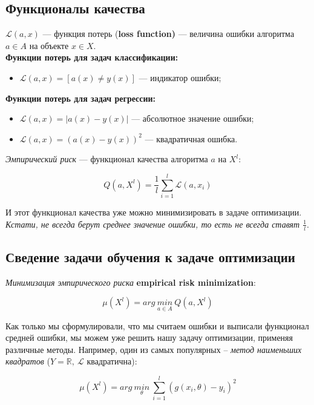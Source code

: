 \documentclass{article}
\begin{document}
\subsection{Функционалы качества}

$\mathscr{L}(a, x)$ --- функция потерь (\textbf{loss function)} --- величина ошибки алгоритма $a \in A$ на объекте $x \in X$.
\\

\textbf{Функции потерь для задач классификации:}
\begin{itemize}
\item $\mathscr{L}(a, x) = [a(x)\not=y(x)]$ --- индикатор ошибки;
\end{itemize}

\quad

\textbf{Функции потерь для задач регрессии:}
\begin{itemize}
\item $\mathscr{L}(a, x) = |a(x) - y(x)|$ --- абсолютное значение ошибки;
\item $\mathscr{L}(a, x) = (a(x) - y(x))^2$ --- квадратичная ошибка.
\end{itemize}

\quad

\textit{Эмпирический риск} --- функционал качества алгоритма $a$ на $X^l$:

$$Q(a, X^l) = \frac{1}{l}\sum\limits_{i = 1}^l \mathscr{L}(a, x_i)$$

И этот функционал качества уже можно минимизировать в задаче оптимизации.
\\

\textit{Кстати, не всегда берут среднее значение ошибки, то есть не всегда ставят $\frac{1}{l}$}.

\subsection{Сведение задачи обучения к задаче оптимизации}

\textit{Минимизация эмпирического риска} \textbf{empirical risk minimization}:

$$\mu(X^l) = arg\ \underset{a \in A}{min}\ Q(a, X^l)$$

Как только мы сформулировали, что мы считаем ошибки и выписали функционал средней ошибки, мы можем уже решить нашу задачу оптимизации, применяя различные методы. Например, один из самых популярных -- \textit{метод наименьших квадратов} ($Y = \mathbb{R},\ \mathscr{L}$ квадратична):

$$\mu(X^l) = arg\ \underset{\theta}{min}\ \sum\limits_{i = 1}^l (g(x_i, \theta) - y_i)^2$$
\end{document}
